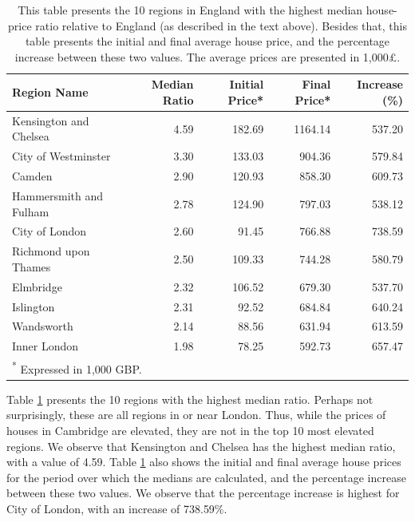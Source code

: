 \documentclass[a4paper,11pt]{article}\usepackage[]{graphicx}\usepackage[]{xcolor}
\newenvironment{knitrout}{}{} %
\begin{document}
\begin{enumerate}
\begin{knitrout}
\color{fgcolor}\begin{table}[H] \captionsetup{margin = 15pt}
\centering
\caption{\label{tab:table_highest_median}This table presents the 10 regions in England with the highest median house-price ratio relative to England (as described in the text above). Besides that, this table presents the initial and final average house price, and the percentage increase between these two values. The average prices are presented in 1,000£.}
\centering
\begin{tabular}[t]{lrrrr}
\toprule
Region Name & Median Ratio & Initial Price* & Final Price* & Increase (\%)\\
\midrule
Kensington and Chelsea & 4.59 & 182.69 & 1164.14 & 537.20\\
City of Westminster & 3.30 & 133.03 & 904.36 & 579.84\\
Camden & 2.90 & 120.93 & 858.30 & 609.73\\
Hammersmith and Fulham & 2.78 & 124.90 & 797.03 & 538.12\\
City of London & 2.60 & 91.45 & 766.88 & 738.59\\
Richmond upon Thames & 2.50 & 109.33 & 744.28 & 580.79\\
Elmbridge & 2.32 & 106.52 & 679.30 & 537.70\\
Islington & 2.31 & 92.52 & 684.84 & 640.24\\
Wandsworth & 2.14 & 88.56 & 631.94 & 613.59\\
Inner London & 1.98 & 78.25 & 592.73 & 657.47\\
\bottomrule
\multicolumn{5}{l}{\rule{0pt}{1em}\textsuperscript{*} Expressed in 1,000 GBP.}\\
\end{tabular}
\end{table} \captionsetup{margin = 15pt}

\end{knitrout}

Table \ref{tab:table_highest_median} presents the 10 regions with the highest median ratio. Perhaps not surprisingly, these are all regions in or near London. Thus, while the prices of houses in Cambridge are elevated, they are not in the top 10 most elevated regions. We observe that Kensington and Chelsea has the highest median ratio, with a value of 4.59. Table \ref{tab:table_highest_median} also shows the initial and final average house prices for the period over which the medians are calculated, and the percentage increase between these two values. We observe that the percentage increase is highest for City of London, with an increase of 738.59\%.





\end{enumerate}
\end{document}
